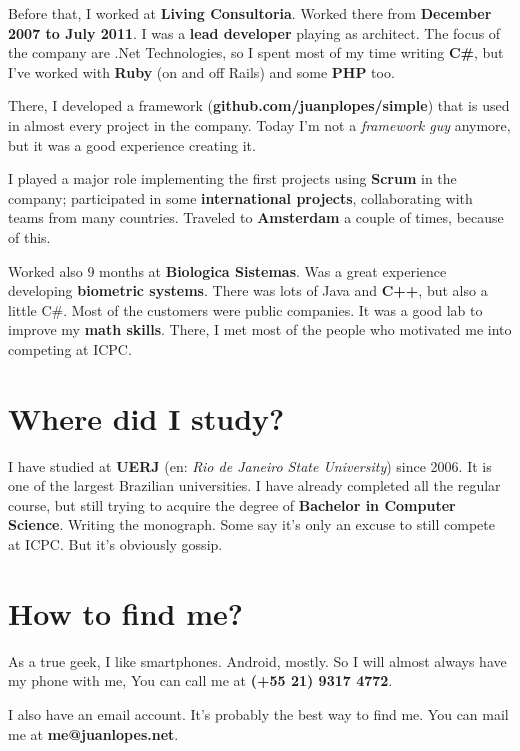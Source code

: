 \documentclass[a4paper,12pt,notitlepage]{article}
\begin{document}
	Before that, I worked at \textbf{Living Consultoria}. Worked there from \textbf{December 2007 to July 2011}. I was a \textbf{lead developer} playing as architect. The focus of the company are .Net Technologies, so I spent most of my time writing \textbf{C\#}, but I've worked with \textbf{Ruby} (on and off Rails) and some \textbf{PHP} too. 
	
	There, I developed a framework (\textbf{github.com/juanplopes/simple}) that is used in almost every project in the company. Today I'm not a \emph{framework guy} anymore, but it was a good experience creating it. 
	
	I played a major role implementing the first projects using \textbf{Scrum} in the company; participated in some \textbf{international projects}, collaborating with teams from many countries. Traveled to \textbf{Amsterdam} a couple of times, because of this.
	
	Worked also 9 months at \textbf{Biologica Sistemas}. Was a great experience developing \textbf{biometric systems}. There was lots of Java and \textbf{C++}, but also a little C\#. Most of the customers were public companies. It was a good lab to improve my \textbf{math skills}. There, I met most of the people who motivated me into competing at ICPC.

\section{Where did I study?}

	I have studied at \textbf{UERJ} (en: \emph{Rio de Janeiro State University}) since 2006. It is one of the largest Brazilian universities. I have already completed all the regular course, but still trying to acquire the degree of \textbf{Bachelor in Computer Science}. Writing the monograph. Some say it’s only an excuse to still compete at ICPC. But it’s obviously gossip.

\section{How to find me?}

	As a true geek, I like smartphones. Android, mostly. So I will almost always have my phone with me, You can call me at \textbf{(+55 21) 9317 4772}.
	
	I also have an email account. It’s probably the best way to find me. You can mail me at \textbf{me@juanlopes.net}.
\end{document}
